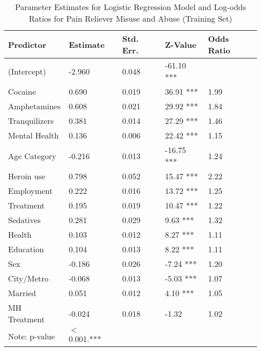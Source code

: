 \documentclass[sigconf]{acmart}
\begin{document}
\begin{table}
  \caption{Parameter Estimates for Logistic Regression Model and Log-odds 
  Ratios for Pain Reliever Misuse and Abuse (Training Set)}
  \label{tab:freq}
  \begin{tabular}{lllll}
    \toprule
    Predictor&  Estimate& Std. Err.& Z-Value & Odds Ratio \\    
    \midrule
    (Intercept)   & -2.960 &   0.048 & -61.10 *** &  \\
    Cocaine       & 0.690  &   0.019 &  36.91 *** & 1.99  \\
    Amphetamines  & 0.608  &   0.021 &  29.92 *** & 1.84  \\
    Tranquilizers & 0.381  &   0.014 &  27.29 *** & 1.46  \\
    Mental Health & 0.136  &   0.006 &  22.42 *** & 1.15  \\
    Age Category  & -0.216 &   0.013 & -16.75 *** & 1.24  \\
    Heroin use    & 0.798  &   0.052 &  15.47 *** & 2.22  \\  
    Employment    & 0.222  &   0.016 &  13.72 *** & 1.25  \\
    Treatment     & 0.195  &   0.019 &  10.47 *** & 1.22  \\
    Sedatives     & 0.281  &   0.029 &   9.63 *** & 1.32  \\   
    Health        & 0.103  &   0.012 &   8.27 *** & 1.11  \\
    Education     & 0.104  &   0.013 &   8.22 *** & 1.11  \\   
    Sex           & -0.186 &   0.026 &  -7.24 *** & 1.20  \\
    City/Metro    & -0.068 &   0.013 &  -5.03 *** & 1.07  \\
    Married       & 0.051  &   0.012 &   4.10 *** & 1.05  \\
    MH Treatment  & -0.024 &   0.018 &  -1.32     & 1.02  \\
    \bottomrule 
    Note: p-value& $<$ 0.001.***  &  &  &   
  \end{tabular}
\end{table}

 
\end{document}

